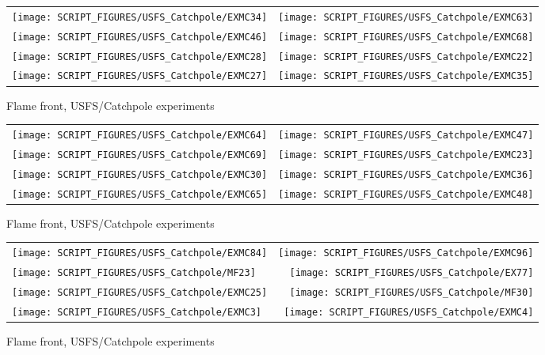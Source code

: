 \begin{figure}[p]
\begin{tabular*}{\textwidth}{l@{\extracolsep{\fill}}r}
\texttt{[image: SCRIPT\_FIGURES/USFS\_Catchpole/EXMC34]} &
\texttt{[image: SCRIPT\_FIGURES/USFS\_Catchpole/EXMC63]} \\
\texttt{[image: SCRIPT\_FIGURES/USFS\_Catchpole/EXMC46]} &
\texttt{[image: SCRIPT\_FIGURES/USFS\_Catchpole/EXMC68]} \\
\texttt{[image: SCRIPT\_FIGURES/USFS\_Catchpole/EXMC28]} &
\texttt{[image: SCRIPT\_FIGURES/USFS\_Catchpole/EXMC22]} \\
\texttt{[image: SCRIPT\_FIGURES/USFS\_Catchpole/EXMC27]} &
\texttt{[image: SCRIPT\_FIGURES/USFS\_Catchpole/EXMC35]} \\
\end{tabular*}
\caption[Flame front, USFS/Catchpole experiments]{Flame front, USFS/Catchpole experiments}
\label{USFS_Catchpole_280}
\end{figure}

\begin{figure}[p]
\begin{tabular*}{\textwidth}{l@{\extracolsep{\fill}}r}
\texttt{[image: SCRIPT\_FIGURES/USFS\_Catchpole/EXMC64]} &
\texttt{[image: SCRIPT\_FIGURES/USFS\_Catchpole/EXMC47]} \\
\texttt{[image: SCRIPT\_FIGURES/USFS\_Catchpole/EXMC69]} &
\texttt{[image: SCRIPT\_FIGURES/USFS\_Catchpole/EXMC23]} \\
\texttt{[image: SCRIPT\_FIGURES/USFS\_Catchpole/EXMC30]} &
\texttt{[image: SCRIPT\_FIGURES/USFS\_Catchpole/EXMC36]} \\
\texttt{[image: SCRIPT\_FIGURES/USFS\_Catchpole/EXMC65]} &
\texttt{[image: SCRIPT\_FIGURES/USFS\_Catchpole/EXMC48]} \\
\end{tabular*}
\caption[Flame front, USFS/Catchpole experiments]{Flame front, USFS/Catchpole experiments}
\label{USFS_Catchpole_288}
\end{figure}

\begin{figure}[p]
\begin{tabular*}{\textwidth}{l@{\extracolsep{\fill}}r}
\texttt{[image: SCRIPT\_FIGURES/USFS\_Catchpole/EXMC84]} &
\texttt{[image: SCRIPT\_FIGURES/USFS\_Catchpole/EXMC96]} \\
\texttt{[image: SCRIPT\_FIGURES/USFS\_Catchpole/MF23]} &
\texttt{[image: SCRIPT\_FIGURES/USFS\_Catchpole/EX77]} \\
\texttt{[image: SCRIPT\_FIGURES/USFS\_Catchpole/EXMC25]} &
\texttt{[image: SCRIPT\_FIGURES/USFS\_Catchpole/MF30]} \\
\texttt{[image: SCRIPT\_FIGURES/USFS\_Catchpole/EXMC3]} &
\texttt{[image: SCRIPT\_FIGURES/USFS\_Catchpole/EXMC4]} \\
\end{tabular*}
\caption[Flame front, USFS/Catchpole experiments]{Flame front, USFS/Catchpole experiments}
\label{USFS_Catchpole_296}
\end{figure}

